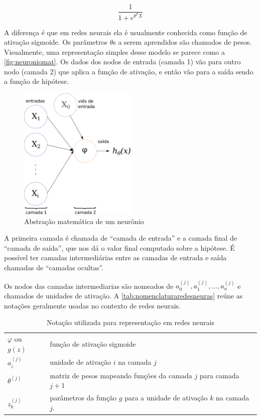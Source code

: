 \begin{equation}
\frac{1}{1 + e^{\theta^TX}} \nonumber
\end{equation}

A diferença é que em redes neurais ela é usualmente conhecida como função de ativação sigmoide. Os parâmetros $\theta$s a serem aprendidos são chamados de pesos. Visualmente, uma representação simples desse modelo se parece como a \autoref{fig:neuroniomat}. Os dados dos nodos de entrada (camada 1) vão para outro nodo (camada 2) que aplica a função de ativação, e então vão para a saída sendo a função de hipótese.

\begin{figure}
\centering
\caption{Abstração matemática de um neurônio} \label{fig:neuroniomat}
\includegraphics[width=0.5\textwidth]{img/redeneuralmat.pdf}
\end{figure}


A primeira camada é chamada de ``camada de entrada'' e a camada final de ``camada de saída'', que nos dá o valor final computado sobre a hipótese. É possível ter camadas intermediárias entre as camadas de entrada e saída chamadas de ``camadas ocultas''. 

Os nodos das camadas intermediarias são nomeados de $a_0^{(j)}, a_1^{(j)}, ..., a_n^{(j)}$ e chamados de unidades de ativação. A \autoref{tab:nomenclaturaredesneuras} reúne as notações geralmente usadas no contexto de redes neurais.

\begin{table}[!htb]
\caption{Notação utilizada para representação em redes neurais} \label{tab:nomenclaturaredesneuras}
\begin{center}
\begin{tabular}{m{2cm}m{12.0cm}}
  \toprule
  $\varphi$ ou $g(z)$ & função de ativação sigmoide\\
  $a_i^{(j)}$ 	   & unidade de ativação $i$ na camada $j$ \\
  $\theta^{(j)}$   & matriz de pesos mapeando funções da camada $j$ para camada $j+1$  \\
  $z_k^{(j)}$	&	parâmetros da função $g$ para a unidade de ativação $k$ na camada $j$. \\
  \bottomrule
\end{tabular}
\end{center}

\end{table}


